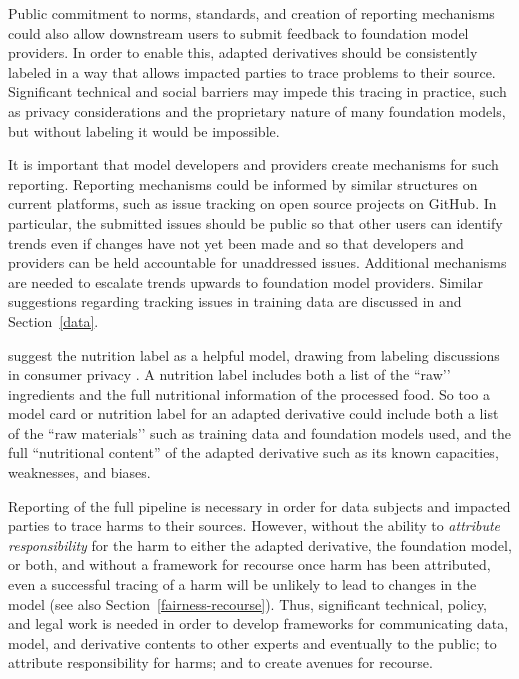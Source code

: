 Public commitment to norms, standards, and creation of reporting mechanisms could also allow downstream users to submit feedback to foundation model providers. In order to enable this, adapted derivatives should be consistently labeled in a way that allows impacted parties to trace problems to their source. Significant technical and social barriers may impede this tracing in practice, such as privacy considerations and the proprietary nature of many foundation models, but without labeling it would be impossible.  

It is important that model developers and providers create mechanisms for such reporting.  Reporting mechanisms could be informed by similar structures on current platforms, such as issue tracking on open source projects on GitHub. In particular, the submitted issues should be public so that other users can identify trends even if changes have not yet been made and so that developers and providers can be held accountable for unaddressed issues. Additional mechanisms are needed to escalate trends upwards to foundation model providers. Similar suggestions regarding tracking issues in training data are discussed in \citet{dinan21} and Section~\ref{data}.

\citet{holland2018dataset} suggest the nutrition label as a helpful model, drawing from labeling discussions in consumer privacy \citep{kelley2009nutrition}.  A nutrition label includes both a list of the ``raw’’ ingredients and the full nutritional information of the processed food. So too a model card \citep{Mitchell_2019} or nutrition label for an adapted derivative could include both a list of the ``raw materials’’ such as training data and foundation models used, and the full ``nutritional content'' of the adapted derivative such as its known capacities, weaknesses, and biases.  

Reporting of the full pipeline is necessary in order for data subjects and impacted parties to trace harms to their sources. However, without the ability to \textit{attribute responsibility} for the harm to either the adapted derivative, the foundation model, or both, and without a framework for recourse once harm has been attributed, even a successful tracing of a harm will be unlikely to lead to changes in the model (see also Section~\ref{fairness-recourse}). Thus, significant technical, policy, and legal work is needed in order to develop frameworks for communicating data, model, and derivative contents to other experts and eventually to the public; to attribute responsibility for harms; and to create avenues for recourse. 


